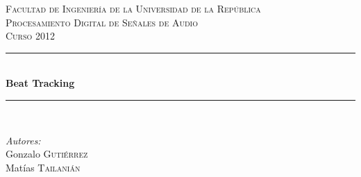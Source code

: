 \documentclass[12pt,a4paper,titlepage]{report}
\newcommand{\HRule}{\rule{\linewidth}{0.5mm}}
\begin{document}
\begin{titlepage}
\begin{center}
\vfill
\textsc{\LARGE Facultad de Ingenier\'ia de la Universidad de la Rep\'ublica}\\[1.5cm]
\vspace{2cm}
\textsc{\LARGE Procesamiento Digital de Señales de Audio\\[1cm]Curso 2012}\\[0.5cm]
\vspace{2.3cm}
\HRule \\[0.4cm]
{ \huge \bfseries Beat Tracking}\\[0.4cm]
\HRule \\[1.5cm]
\vspace{2cm}
\begin{minipage}{0.4\textwidth}
\begin{flushleft} \large
\emph{Autores:}\\
Gonzalo \textsc{Gutiérrez}\\ Mat\'ias \textsc{Tailani\'an}
\end{flushleft}
\end{minipage}
\begin{minipage}{0.4\textwidth}
\begin{flushright} \large
\end{flushright}
\end{minipage}

\vspace{2cm}

\vfill
\begin{figure} [h!]
\centering
{}\hspace{1cm}
\hspace{1cm}
\end{figure}


\end{center}
\end{titlepage}
\end{document}
